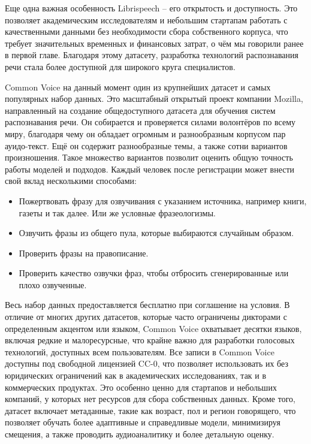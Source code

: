Еще одна важная особенность Librispeech -- его открытость и доступность.
Это позволяет академическим исследователям и небольшим стартапам работать с качественными данными без необходимости сбора собственного корпуса, что требует значительных временных и финансовых затрат, о чём мы говорили ранее в первой главе.
Благодаря этому датасету, разработка технологий распознавания речи стала более доступной для широкого круга специалистов.

Common Voice на данный момент один из крупнейших датасет и самых популярных набор данных.
Это масштабный открытый проект компании Mozilla, направленный на создание общедоступного датасета для обучения систем распознавания речи. 
Он собирается и проверяется силами волонтёров по всему миру, благодаря чему он обладает огромным и разнообразным корпусом пар ауидо-текст.
Ещё он содержит разнообразные темы, а также сотни вариантов произношения.
Такое множество вариантов позволит оценить общую точность работы моделей и подходов.
Каждый человек после регистрации может  внести свой вклад несколькими способами:
\begin{itemize}
  \item Пожертвовать фразу для озвучивания с указанием источника, например книги, газеты и так далее.
    Или же условные фразеологизмы.
  \item Озвучить фразы из общего пула, которые выбираются случайным образом.
  \item Проверить фразы на правописание.
  \item Проверить качество озвучки фраз, чтобы отбросить сгенерированные или плохо озвученные.
\end{itemize}
Весь набор данных предоставляется бесплатно при соглашение на условия.
В отличие от многих других датасетов, которые часто ограничены дикторами с определенным акцентом или языком, Common Voice охватывает десятки языков, включая редкие и малоресурсные, что крайне важно для разработки голосовых технологий, доступных всем пользователям.
Все записи в Common Voice доступны под свободной лицензией CC-0, что позволяет использовать их без юридических ограничений как в академических исследованиях, так и в коммерческих продуктах.
Это особенно ценно для стартапов и небольших компаний, у которых нет ресурсов для сбора собственных данных.
Кроме того, датасет включает метаданные, такие как возраст, пол и регион говорящего, что позволяет обучать более адаптивные и справедливые модели, минимизируя смещения, а также проводить аудиоаналитику и более детальную оценку.

